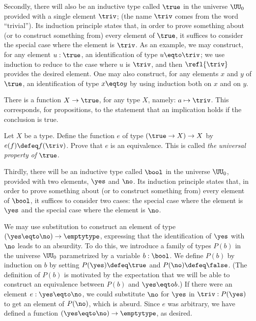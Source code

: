 Secondly, there will also be an inductive type called $\true$ in the universe $\UU_0$ provided with a single element $\triv$; (the name $\triv$
comes from the word ``trivial'').  Its induction principle states that, in order to prove something about (or to construct something from) every
element of $\true$, it suffices to consider the special case where the element is $\triv$.  As an example, we may construct, for any element
$u : \true$, an identification of type $u \eqto \triv$; we use induction to reduce to the case where $u$ is $\triv$, and then $\refl{\triv}$ provides the
desired element.  One may also construct, for any elements $x$ and $y$ of $\true$, an identification of type $x \eqto y$ by using induction both on $x$ and
on $y$.

There is a function $X \to \true$, for any type $X$, namely: $a \mapsto \triv$.  This corresponds, for propositions, to the statement that an
implication holds if the conclusion is true.

\begin{xca}\label{xca:True-univ-prop}
  Let $X$ be a type. Define the function $e$ of type
  $(\true\to X) \to X$ by $e(f)\defeq f(\triv)$.
  Prove that $e$ is an equivalence.
  This is called \emph{the universal property of} $\true$.
\end{xca}

Thirdly, there will be an inductive type called $\bool$ in the universe $\UU_0$, provided with two elements, $\yes$ and $\no$.  Its induction
principle states that, in order to prove something about (or to construct something from) every element of $\bool$, it suffices to consider two
cases: the special case where the element is $\yes$ and the special case where the element is $\no$.

We may use substitution to construct an element of type
$(\yes \eqto \no)\to \emptytype$, expressing that the identification
of $\yes$ with $\no$ leads to an absurdity.
To do this, we introduce a family of types $P(b)$ in the universe
$\UU_0$ parametrized by a variable $b:\bool$.  We define $P(b)$ by induction on $b$ by setting $P(\yes) \defeq \true$ and
$P(\no) \defeq \false$.  (The definition of $P(b)$ is motivated by the expectation that we will be able to construct an equivalence between $P(b)$ and
$\yes \eqto b$.)  If there were an element $e: \yes \eqto \no$, we could substitute $\no$ for $\yes$ in $\triv : P (\yes)$ to get an element of $P(\no)$,
which is absurd.  Since $e$ was arbitrary, we have defined a function $(\yes \eqto \no) \to \emptytype$, as desired.

